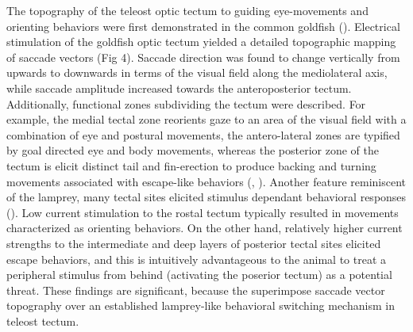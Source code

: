 \documentclass{ar-1col}
\begin{document}
{The topography of the teleost optic tectum to guiding eye-movements and orienting behaviors were first demonstrated in the common goldfish (\cite{salas1997tectal}). Electrical stimulation of the goldfish optic tectum yielded a detailed topographic mapping of saccade vectors (Fig 4). Saccade direction was found to change vertically from upwards to downwards in terms of the visual field along the mediolateral axis, while saccade amplitude increased towards the anteroposterior tectum. Additionally, functional zones subdividing the tectum were described. For example, the medial tectal zone reorients gaze to an area of the visual field with a combination of eye and postural movements, the antero-lateral zones are typified by goal directed eye and body movements, whereas the posterior zone of the tectum is elicit distinct tail and fin-erection to produce backing and turning movements associated with escape-like behaviors (\cite{torres2005visual}, \cite{herrero1998tail}). Another feature reminiscent of the lamprey, many tectal sites elicited stimulus dependant behavioral responses (\cite{herrero1998tail}). Low current stimulation to the rostal tectum typically resulted in movements characterized as orienting behaviors. On the other hand, relatively higher current strengths to the intermediate and deep layers of posterior tectal sites elicited escape behaviors, and this is intuitively advantageous to the animal to treat a peripheral stimulus from behind (activating the poserior tectum) as a potential threat. These findings are significant, because the superimpose saccade vector topography over an established lamprey-like behavioral switching mechanism in teleost tectum.  

}
\end{document}
